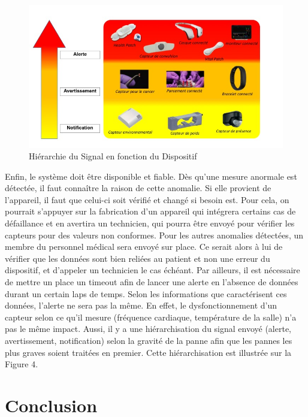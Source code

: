 \documentclass{article}
\begin{document}
\begin{figure}[h!]
	\hspace*{-2.5cm}
	\centering
	\includegraphics[width=1.5\textwidth]{Figure4.jpg}
	\caption{Hiérarchie du Signal en fonction du Dispositif}
	\label{fig:balance}
\end{figure}

Enfin, le système doit être disponible et fiable. Dès qu’une mesure anormale est détectée, il faut connaître la raison de cette anomalie. Si elle provient de l'appareil, il faut que celui-ci soit vérifié et changé si besoin est. Pour cela, on pourrait s’appuyer sur la fabrication d'un appareil qui intégrera certains cas de défaillance et en avertira un technicien, qui pourra être envoyé pour vérifier les capteurs pour des valeurs non conformes. Pour les autres anomalies détectées, un membre du personnel médical sera envoyé sur place. Ce serait alors à lui de vérifier que les données sont bien reliées au patient et non une erreur du dispositif, et d'appeler un technicien le cas échéant. Par ailleurs, il est nécessaire de mettre un place un timeout afin de lancer une alerte en l’absence de données durant un certain laps de temps. Selon les informations que caractérisent ces données, l’alerte ne sera pas la même. En effet, le dysfonctionnement d’un capteur selon ce qu’il mesure (fréquence cardiaque, température de la salle) n’a pas le même impact. Aussi, il y a une hiérarchisation du signal envoyé (alerte, avertissement, notification) selon la gravité de la panne afin que les pannes les plus graves soient traitées en premier. Cette hiérarchisation est illustrée sur la Figure 4.

\section{ Conclusion }
 
\end{document}
